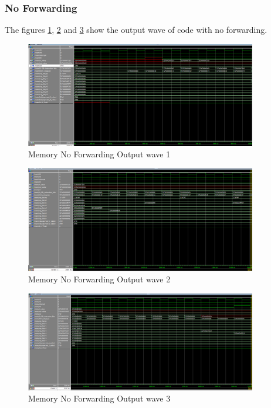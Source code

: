 \subsubsection{No Forwarding}
The figures \ref{fig:mem_no_1}, \ref{fig:mem_no_2} and \ref{fig:mem_no_3} show the output wave of code with no forwarding.
\begin{figure}[H]
    \centering
    \includegraphics[width=0.9\textwidth]{images/test_cases/memory/Memory_no_stall_1.PNG}
    \caption{Memory No Forwarding Output wave 1}
    \label{fig:mem_no_1}
\end{figure}

\begin{figure}[H]
    \centering
    \includegraphics[width=0.9\textwidth]{images/test_cases/memory/Memory_no_stall_2.PNG}
    \caption{Memory No Forwarding Output wave 2}
    \label{fig:mem_no_2}
\end{figure}

\begin{figure}[H]
    \centering
    \includegraphics[width=0.9\textwidth]{images/test_cases/memory/Memory_no_stall_3.PNG}
    \caption{Memory No Forwarding Output wave 3}
    \label{fig:mem_no_3}
\end{figure}

